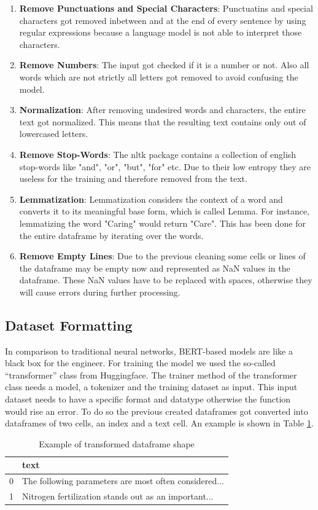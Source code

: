 \begin{enumerate}
	\item \textbf{Remove Punctuations and Special Characters}: Punctuatins and special characters got removed inbetween and at the end of every sentence by using regular expressions because a language model is not able to interpret those characters. 
	\item \textbf{Remove Numbers}: The input got checked if it is a number or not. Also all words which are not strictly all letters got removed to avoid confusing the model.
	\item \textbf{Normalization}: After removing undesired words and characters, the entire text got normalized. This means that the resulting text contains only out of lowercased letters.
	\item \textbf{Remove Stop-Words}: The nltk package contains a collection of english stop-words like "and", "or", "but", "for" etc. Due to their low entropy they are useless for the training and therefore removed from the text.
	\item \textbf{Lemmatization}: Lemmatization considers the context of a word and converts it to its meaningful base form, which is called Lemma. For instance, lemmatizing the word "Caring" would return "Care". This has been done for the entire dataframe by iterating over the words.
	\item \textbf{Remove Empty Lines}: Due to the previous cleaning some cells or lines of the dataframe may be empty now and represented as NaN values in the dataframe. These NaN values have to be replaced with spaces, otherwise they will cause errors during further processing.
\end{enumerate}


\subsection{Dataset Formatting}
In comparison to traditional neural networks, BERT-based models are like a black box for the engineer. For training the model we used the so-called “transformer” class from \alert{Huggingface}.  The trainer method of the transformer class needs a model, a tokenizer and the training dataset as input. This input dataset needs to have a specific format and datatype otherwise the function would rise an error.  To do so the previous created dataframes got converted into dataframes of two cells, an index and a text cell. An example is shown in Table \ref{tab:format}.

\begin{table}[H]
	\centering
	\begin{tabular}{ll}
		\hline
		& \textbf{text}                                         \\ \hline
		0 & The following parameters are most often considered... \\ \hline
		1 & Nitrogen fertilization stands out as an important...  \\ \hline
	\end{tabular}
	\caption{Example of transformed dataframe shape}
	\label{tab:format}
\end{table}

